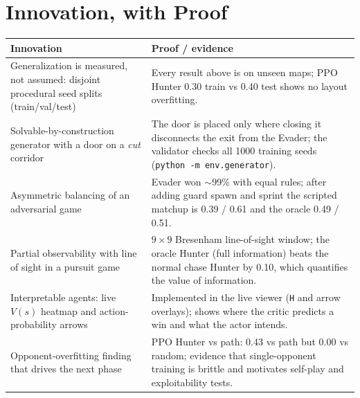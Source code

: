 \documentclass[11pt,a4paper]{article}
\newcommand{\code}[1]{\texttt{#1}}
\begin{document}
\section{Innovation, with Proof}
\begin{center}
\begin{tabularx}{\textwidth}{p{4.2cm}X}
\toprule
\textbf{Innovation} & \textbf{Proof / evidence}\\
\midrule
Generalization is measured, not assumed: disjoint procedural seed splits (train/val/test) &
Every result above is on unseen maps; PPO Hunter 0.30 train vs 0.40 test shows no layout
overfitting.\\
Solvable-by-construction generator with a door on a \emph{cut} corridor &
The door is placed only where closing it disconnects the exit from the Evader; the validator checks
all 1000 training seeds (\code{python -m env.generator}).\\
Asymmetric balancing of an adversarial game &
Evader won $\sim$99\% with equal rules; after adding guard spawn and sprint the scripted matchup is
0.39 / 0.61 and the oracle 0.49 / 0.51.\\
Partial observability with line of sight in a pursuit game &
$9\times9$ Bresenham line-of-sight window; the oracle Hunter (full information) beats the
normal chase Hunter by 0.10, which quantifies the value of information.\\
Interpretable agents: live $V(s)$ heatmap and action-probability arrows &
Implemented in the live viewer (\code{H} and arrow overlays); shows where the critic predicts a
win and what the actor intends.\\
Opponent-overfitting finding that drives the next phase &
PPO Hunter vs path: 0.43 vs path but 0.00 vs random; evidence that single-opponent training is
brittle and motivates self-play and exploitability tests.\\
\bottomrule
\end{tabularx}
\end{center}

\end{document}
